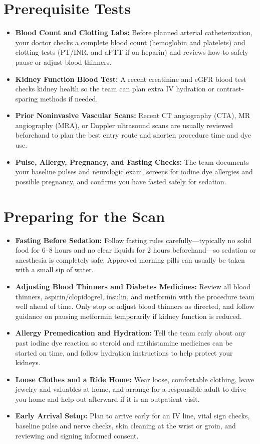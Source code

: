 \section{Prerequisite Tests}
\begin{itemize}
\item \textbf{Blood Count and Clotting Labs:} Before planned arterial catheterization, your doctor checks a complete blood count (hemoglobin and platelets) and clotting tests (PT/INR, and aPTT if on heparin) and reviews how to safely pause or adjust blood thinners.
\item \textbf{Kidney Function Blood Test:} A recent creatinine and eGFR blood test checks kidney health so the team can plan extra IV hydration or contrast-sparing methods if needed.
\item \textbf{Prior Noninvasive Vascular Scans:} Recent CT angiography (CTA), MR angiography (MRA), or Doppler ultrasound scans are usually reviewed beforehand to plan the best entry route and shorten procedure time and dye use.
\item \textbf{Pulse, Allergy, Pregnancy, and Fasting Checks:} The team documents your baseline pulses and neurologic exam, screens for iodine dye allergies and possible pregnancy, and confirms you have fasted safely for sedation.
\end{itemize}

\section{Preparing for the Scan}
\begin{itemize}
\item \textbf{Fasting Before Sedation:} Follow fasting rules carefully---typically no solid food for 6--8 hours and no clear liquids for 2 hours beforehand---so sedation or anesthesia is completely safe. Approved morning pills can usually be taken with a small sip of water.
\item \textbf{Adjusting Blood Thinners and Diabetes Medicines:} Review all blood thinners, aspirin/clopidogrel, insulin, and metformin with the procedure team well ahead of time. Only stop or adjust blood thinners as directed, and follow guidance on pausing metformin temporarily if kidney function is reduced.
\item \textbf{Allergy Premedication and Hydration:} Tell the team early about any past iodine dye reaction so steroid and antihistamine medicines can be started on time, and follow hydration instructions to help protect your kidneys.
\item \textbf{Loose Clothes and a Ride Home:} Wear loose, comfortable clothing, leave jewelry and valuables at home, and arrange for a responsible adult to drive you home and help out afterward if it is an outpatient visit.
\item \textbf{Early Arrival Setup:} Plan to arrive early for an IV line, vital sign checks, baseline pulse and nerve checks, skin cleaning at the wrist or groin, and reviewing and signing informed consent.
\end{itemize}

